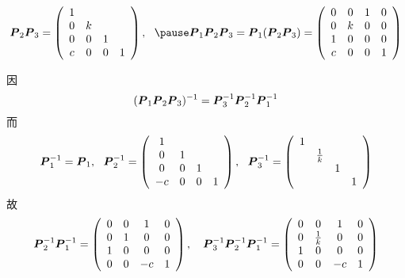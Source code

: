 \begin{frame}

  \begin{jie}
    $$
    \begin{aligned}
      \MP_2\MP_3 =    \left(
        \begin{array}{cccc}
          1& & &  \\
          0&k& &  \\
          0&0&1& \\
          c&0&0&1
        \end{array}
      \right), ~~\pause
      \MP_1\MP_2\MP_3=\MP_1(\MP_2\MP_3) =\left(
        \begin{array}{cccc}
          0&0&1&0 \\
          0&k&0&0  \\
          1&0&0&0  \\
          c&0&0&1
        \end{array}
      \right)
    \end{aligned}
    $$
  \end{jie}

\end{frame}


\begin{frame}

  \begin{jie}[续]
    因
    $$
    (\boldsymbol{P}_1\boldsymbol{P}_2\boldsymbol{P}_3)^{-1} = \boldsymbol{P}_3^{-1}\boldsymbol{P}_2^{-1}\boldsymbol{P}_1^{-1}
    $$
    \pause
    而
    $$
    \boldsymbol{P}_1^{-1} = \boldsymbol{P}_1, ~~
    \boldsymbol{P}_2^{-1} = \left(
      \begin{array}{cccc}
        1& & &  \\
        0&1& &  \\
        0&0&1& \\
        -c&0&0&1
      \end{array}
    \right), ~~
    \boldsymbol{P}_3^{-1} = \left(
      \begin{array}{cccc}
        1& & &  \\
         &\frac1k& &  \\
         & &1& \\
         & & &1
      \end{array}
    \right)
    $$    
    \pause
    故
    $$
    \boldsymbol{P}_2^{-1}\boldsymbol{P}_1^{-1} =   \left(
      \begin{array}{cccc}
        0&0&1&0 \\
        0&1&0&0 \\
        1&0&0&0 \\
        0&0&-c&1
      \end{array}
    \right), \quad  
    \boldsymbol{P}_3^{-1}\boldsymbol{P}_2^{-1}\boldsymbol{P}_1^{-1} =  \left(
      \begin{array}{cccc}
        0&0&1&0 \\
        0&\frac1k&0&0 \\
        1&0&0&0 \\
        0&0&-c&1
      \end{array}
    \right)
    $$
  \end{jie}

\end{frame}


